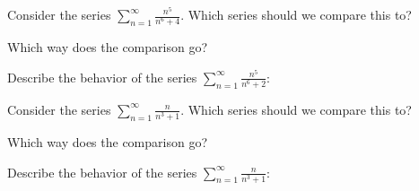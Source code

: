 \documentclass{ximera}
\begin{document}
\begin{problem}
Consider the series $\sum_{n=1}^\infty \frac{n^5}{n^6 + 4}$.
Which series should we compare this to?

\begin{multipleChoice}
\end{multipleChoice}

Which way does the comparison go?
\begin{multipleChoice}
\end{multipleChoice}

Describe the behavior of the series $\sum_{n=1}^\infty \frac{n^5}{n^6 + 2}:$
\begin{multipleChoice}
\end{multipleChoice}

\end{problem}






\begin{problem}
Consider the series $\sum_{n=1}^\infty \frac{n}{n^3 + 1}$.
Which series should we compare this to?

\begin{multipleChoice}
\end{multipleChoice}

Which way does the comparison go?
\begin{multipleChoice}
\end{multipleChoice}

Describe the behavior of the series $\sum_{n=1}^\infty \frac{n}{n^3 + 1}:$
\begin{multipleChoice}
\end{multipleChoice}

\end{problem}
\end{document}
